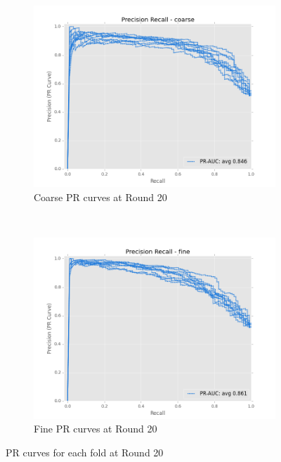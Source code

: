 \documentclass[ms]{nuthesis}
\begin{document}
\FloatBarrier
\begin{figure}[!htb]
    \centering
    \begin{subfigure}[t]{0.5\textwidth}
        \centering
        \includegraphics[width=\textwidth]{fig/RndNum_20_LogReg_PrCurves_coarse}
        \caption{Coarse PR curves at Round 20}
    \end{subfigure}%
    ~
    \begin{subfigure}[t]{0.5\textwidth}
        \centering
        \includegraphics[width=\textwidth]{fig/RndNum_20_LogReg_PrCurves_fine}
        \caption{Fine PR curves at Round 20}
    \end{subfigure}
    \caption{PR curves for each fold at Round 20}
    \label{fig:rnd20LogRegPr}
\end{figure}
\FloatBarrier
\end{document}

